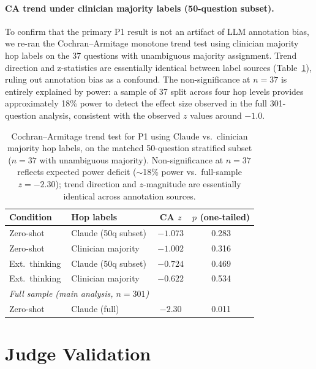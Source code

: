 \documentclass{article}
\begin{document}
\paragraph{CA trend under clinician majority labels (50-question subset).}
To confirm that the primary P1 result is not an artifact of LLM annotation bias,
we re-ran the Cochran--Armitage monotone trend test using clinician majority hop
labels on the 37 questions with unambiguous majority assignment.
Trend direction and z-statistics are essentially identical between label sources
(Table~\ref{tab:clinician_ca}), ruling out annotation bias as a confound.
The non-significance at $n = 37$ is entirely explained by power: a sample of
37 split across four hop levels provides approximately 18\% power to detect
the effect size observed in the full 301-question analysis, consistent with the
observed $z$ values around $-1.0$.

\begin{table}[h]
\centering
\caption{Cochran--Armitage trend test for P1 using Claude vs.\ clinician majority
hop labels, on the matched 50-question stratified subset ($n = 37$ with
unambiguous majority). Non-significance at $n = 37$ reflects expected power
deficit ($\sim$18\% power vs.\ full-sample $z = -2.30$); trend direction and
$z$-magnitude are essentially identical across annotation sources.}
\label{tab:clinician_ca}
\small
\begin{tabular}{llcc}
\toprule
\textbf{Condition} & \textbf{Hop labels} & \textbf{CA $z$} & \textbf{$p$ (one-tailed)} \\
\midrule
Zero-shot    & Claude (50q subset)    & $-1.073$ & 0.283 \\
Zero-shot    & Clinician majority     & $-1.002$ & 0.316 \\
Ext.\ thinking & Claude (50q subset) & $-0.724$ & 0.469 \\
Ext.\ thinking & Clinician majority   & $-0.622$ & 0.534 \\
\midrule
\multicolumn{2}{l}{\textit{Full sample (main analysis, $n = 301$)}} & & \\
Zero-shot    & Claude (full)          & $-2.30$ & 0.011 \\
\bottomrule
\end{tabular}
\end{table}

\section{Judge Validation}
\label{app:judge}
\end{document}
